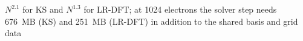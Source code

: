 $N^{2.1}$ for KS and $N^{1.3}$ for LR-DFT; at 1024 electrons the solver step needs 676~MB (KS) and 251~MB (LR-DFT) in addition to the shared basis and grid data